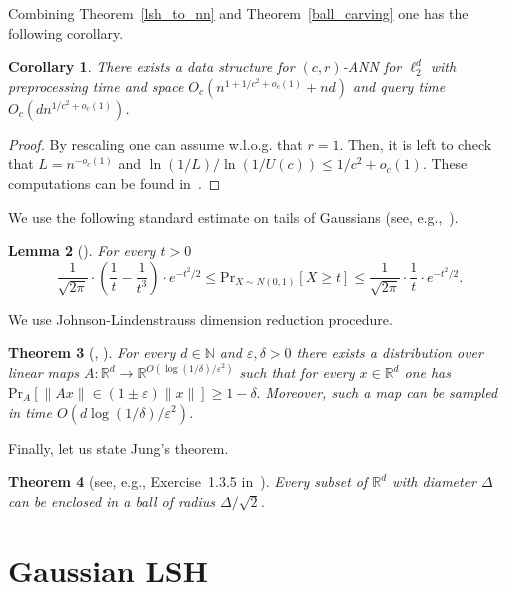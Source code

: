 \documentclass[11pt,letterpaper]{article}
\newtheorem{theorem}{Theorem}
\newtheorem{lemma}[theorem]{Lemma}
\newtheorem{corollary}[theorem]{Corollary}
\newcommand{\Nbb}{\mathbb{N}}
\newcommand{\Rbb}{\mathbb{R}}
\newcommand{\eps}{\varepsilon}
\begin{document}
Combining Theorem~\ref{lsh_to_nn} and Theorem~\ref{ball_carving} one has the following corollary.

\begin{corollary}
    There exists a data structure for $(c, r)$-ANN for $\ell_2^d$
    with preprocessing time and space $O_c(n^{1 + 1/c^2 + o_{c}(1)} + nd)$ and query time
    $O_c(d n^{1/c^2 + o_{c}(1)})$.
\end{corollary}
\begin{proof}
    By rescaling one can assume w.l.o.g. that $r = 1$. Then, it is left to check that
    $L = n^{-o_{c}(1)}$ and
    $
        \ln (1 / L) / \ln (1 / U(c)) \leq 1 / c^2 + o_{c}(1).
    $
    These computations can be found in~\cite{ai-nohaa-06}.
\end{proof}

We use the following standard estimate on tails of Gaussians (see, e.g.,~\cite{kms-agcsp-98}).

\begin{lemma}[\cite{kms-agcsp-98}]
    \label{gaussians}
    For every $t > 0$
    $$
        \frac{1}{\sqrt{2 \pi}} \cdot \left(\frac{1}{t} - \frac{1}{t^3}\right)
        \cdot e^{-t^2 / 2} \leq \mathrm{Pr}_{X \sim N(0, 1)}[X \geq t]
        \leq \frac{1}{\sqrt{2 \pi}} \cdot \frac{1}{t} \cdot e^{-t^2 / 2}.
    $$
\end{lemma}

We use Johnson-Lindenstrauss dimension reduction procedure.

\begin{theorem}[\cite{jl-elmhs-84}, \cite{dg-eptjl-03}]
    \label{jl_transform}
    For every $d \in \Nbb$ and $\eps, \delta > 0$ there exists a distribution over linear maps $A \colon \Rbb^d \to \Rbb^{O(\log(1 / \delta) / \eps^2)}$
    such that for every $x \in \Rbb^d$ one has
    $
        \mathrm{Pr}_A[\|Ax\| \in (1 \pm \eps) \|x\|] \geq 1 - \delta.
    $
    Moreover, such a map can be sampled in time $O(d \log(1 / \delta) / \eps^2)$.
\end{theorem}

Finally, let us state Jung's theorem.

\begin{theorem}[see, e.g., Exercise~1.3.5 in~\cite{m-ldg-02}]
    \label{jung}
    Every subset of $\Rbb^d$ with diameter $\Delta$ can be enclosed in a ball of radius $\Delta / \sqrt{2}$.
\end{theorem}



\section{Gaussian LSH}
\end{document}
